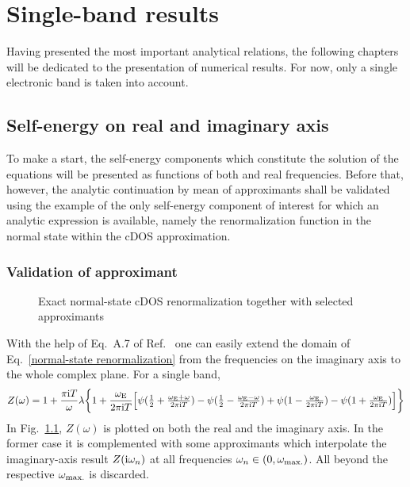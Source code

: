 
\chapter{Single-band results}

Having presented the most important analytical relations, the following chapters
will be dedicated to the presentation of numerical results. For now, only a
single electronic band is taken into account.

\section{Self-energy on real and imaginary axis}

To make a start, the self-energy components which constitute the solution of the
 equations will be presented as functions of both
 and real frequencies. Before that, however, the analytic
continuation by mean of  approximants shall be validated using the
example of the only self-energy component of interest for which an analytic
expression is available, namely the renormalization function in the normal state
within the cDOS approximation.

\subsection{Validation of  approximant}

\begin{figure}
    
    
    \caption{Exact normal-state cDOS renormalization together with selected
              approximants}
    \label{validation Pade}
\end{figure}
%
With the help of Eq.~A.7 of Ref.~ one can easily
extend the domain of Eq.~\ref{normal-state renormalization} from the
 frequencies on the imaginary axis to the whole complex plane.
For a single band,
%
\begin{equation*}
    Z(\omega) = 1 + \frac {\pi \mathrm i T} \omega \lambda \bigg \{
        1 + \frac{\omega \sb{\text{E}}}{2 \pi \mathrm i T} \Big[
              \psi(\tfrac 1 2 + \tfrac{\omega \sb{\text{E}} + \omega}{2 \pi \mathrm i T})
            - \psi(\tfrac 1 2 - \tfrac{\omega \sb{\text{E}} - \omega}{2 \pi \mathrm i T})
            + \psi(1 - \tfrac{\omega \sb{\text{E}}}{2 \pi \mathrm i T})
            - \psi(1 + \tfrac{\omega \sb{\text{E}}}{2 \pi \mathrm i T})
        \Big]
    \bigg \}
\end{equation*}
%
In Fig.~\ref{validation Pade}, $Z(\omega)$ is plotted on both the real and the
imaginary axis. In the former case it is complemented with some 
approximants which interpolate the imaginary-axis result $Z(\mathrm i \omega_n)$ at all
 frequencies $\omega_n \in (0, \omega \sb{\text{max.}})$. All beyond
the respective $\omega \sb{\text{max.}}$ is discarded.

